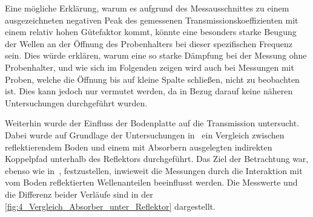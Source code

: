 Eine mögliche Erklärung, warum es aufgrund des Messausschnittes zu einem ausgezeichneten negativen Peak des gemessenen Transmissionskoeffizienten mit einem relativ hohen Gütefaktor kommt, könnte eine besonders starke Beugung der Wellen an der Öffnung des Probenhalters bei dieser spezifischen Frequenz sein. Dies würde erklären, warum eine so starke Dämpfung bei der Messung ohne Probenhalter, und wie sich im Folgenden zeigen wird auch bei Messungen mit Proben, welche die Öffnung bis auf kleine Spalte schließen, nicht zu beobachten ist. Dies kann jedoch nur vermutet werden, da in Bezug darauf keine näheren Untersuchungen durchgeführt wurden. 
\par
\vspace{\linespace}
\newpage
Weiterhin wurde der Einfluss der Bodenplatte auf die Transmission untersucht. Dabei wurde auf Grundlage der Untersuchungen in~\cite{Vergleich_Absorberhalle_Groundplane} ein Vergleich zwischen reflektierendem Boden und einem mit Absorbern ausgelegten indirekten Koppelpfad unterhalb des Reflektors durchgeführt. Das Ziel der Betrachtung war, ebenso wie in~\cite{Vergleich_Absorberhalle_Groundplane}, festzustellen, inwieweit die Messungen durch die Interaktion mit vom Boden reflektierten Wellenanteilen beeinflusst werden. Die Messwerte und die Differenz beider Verläufe sind in der \Abb\ref{fig:4_Vergleich_Absorber_unter_Reflektor} dargestellt.
\par
\vspace{\linespace}

